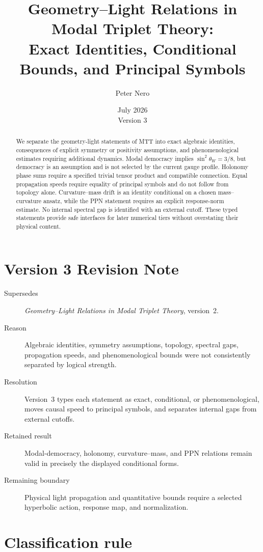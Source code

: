 \documentclass[11pt]{article}
\title{Geometry--Light Relations in Modal Triplet Theory:\\Exact Identities, Conditional Bounds, and Principal Symbols}
\author{Peter Nero}
\date{July 2026\\Version 3}
\begin{document}
\maketitle

\begin{abstract}
We separate the geometry-light statements of MTT into exact algebraic
identities, consequences of explicit symmetry or positivity assumptions, and
phenomenological estimates requiring additional dynamics. Modal democracy
implies $\sin^2\theta_W=3/8$, but democracy is an assumption and is not selected
by the current gauge profile. Holonomy phase sums require a specified trivial
tensor product and compatible connection. Equal propagation speeds require
equality of principal symbols and do not follow from topology alone.
Curvature--mass drift is an identity conditional on a chosen mass--curvature
ansatz, while the PPN statement requires an explicit response-norm estimate.
No internal spectral gap is identified with an external cutoff. These typed
statements provide safe interfaces for later numerical tiers without
overstating their physical content.
\end{abstract}

\section*{Version 3 Revision Note}
\begin{description}
\item[Supersedes] \emph{Geometry--Light Relations in Modal Triplet Theory},
version~2.
\item[Reason] Algebraic identities, symmetry assumptions, topology, spectral
gaps, propagation speeds, and phenomenological bounds were not consistently
separated by logical strength.
\item[Resolution] Version~3 types each statement as exact, conditional, or
phenomenological, moves causal speed to principal symbols, and separates
internal gaps from external cutoffs.
\item[Retained result] Modal-democracy, holonomy, curvature--mass, and PPN
relations remain valid in precisely the displayed conditional forms.
\item[Remaining boundary] Physical light propagation and quantitative bounds
require a selected hyperbolic action, response map, and normalization.
\end{description}

\section{Classification rule}
\end{document}
